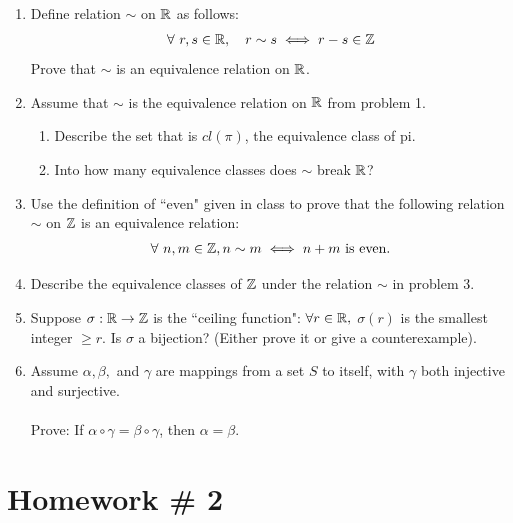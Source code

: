 \begin{enumerate}
    \item Define relation $\sim$ on ${\mathbb{R}}$ as follows:
    \begin{align}
        \forall \ r,s \in {\mathbb{R}}, \ \ \ r\sim s \iff r-s\in {\mathbb{Z}} \nonumber
    \end{align}
    Prove that $\sim$ is an equivalence relation on ${\mathbb{R}}$. \\ \steezybreak

    \item Assume that $\sim$ is the equivalence relation on ${\mathbb{R}}$ from problem 1.
    \begin{enumerate}[label=\alph*)]
        \item Describe the set that is $cl(\pi)$, the equivalence class of pi.
        \item Into how many equivalence classes does $\sim$ break ${\mathbb{R}}$? \\ \steezybreak
        
    \end{enumerate}
    \item Use the definition of ``even" given in class to prove that the following relation $\sim$ on ${\mathbb{Z}}$ is an equivalence relation:
    \begin{align}
        \forall \ n,m \in {\mathbb{Z}}, n\sim m \iff n+m \text{ is even.}\nonumber
    \end{align}
    \item Describe the equivalence classes of ${\mathbb{Z}}$ under the relation $\sim$ in problem 3. \\ \steezybreak
    
    \item Suppose $\sigma : {\mathbb{R}} \to {\mathbb{Z}}$ is the ``ceiling function": $\forall r\in {\mathbb{R}},$ $\sigma(r)$ is the smallest integer $\geq r$. Is $\sigma$ a bijection? (Either prove it or give a counterexample). \\ \steezybreak
    
    \item Assume $\alpha, \beta,$ and $\gamma$ are mappings from a set $S$ to itself, with $\gamma$ both injective and surjective. \\ \\
    Prove: If $\alpha \circ \gamma = \beta \circ \gamma$, then $\alpha = \beta$.
\end{enumerate}
\newpage

\section{Homework \# 2}
\label{sec:HW2}

